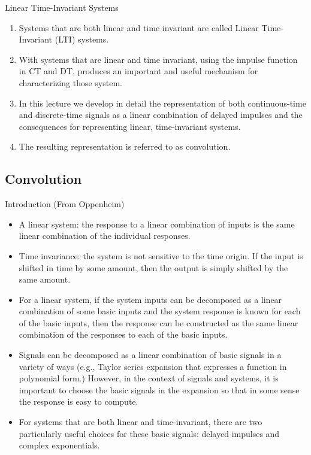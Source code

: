 \begin{frame}{Linear Time-Invariant Systems}
    \begin{enumerate}
        \item Systems that are both linear and time invariant are called Linear Time-Invariant (LTI) systems.
        \item With systems that are linear and time invariant, using the impulse function in CT and DT, produces an important and useful mechanism for characterizing those system.
        \item In this lecture we develop in detail the representation of both continuous-time and discrete-time signals as a linear combination of delayed impulses and the consequences for representing linear, time-invariant systems.
        \item The resulting representation is referred to as convolution.
    \end{enumerate}
\end{frame}


\subsection{Convolution}

\begin{frame}{Introduction (From Oppenheim)}
    \begin{itemize}
        \item A linear system: the response to a linear combination of inputs is the same linear combination of the individual responses.
        \item Time invariance: the system is not sensitive to the time origin. If the input is shifted in time by some amount, then the output is simply shifted by the same amount.
        \item For a linear system, if the system inputs can be decomposed as a linear combination of some basic inputs and the system response is known for each of the basic inputs, then the response can be constructed as the same linear combination of the responses to each of the basic inputs.
        \item Signals can be decomposed as a linear combination of basic signals in a variety of ways (e.g., Taylor series expansion that expresses a function in polynomial form.) However, in the context of signals and systems, it is important to choose the basic signals in the expansion so that in some sense the response is easy to compute.
        \item For systems that are both linear and time-invariant, there are two particularly useful choices for these basic signals: delayed impulses and complex exponentials.
    \end{itemize}
\end{frame}

